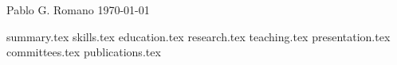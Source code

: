 \documentclass[11pt, a4paper]{awesome-cv}
\newcommand*{\sectiondir}{./sections/}
\begin{document}
\makecvheader[C]

\makecvfooter
  {Pablo G. Romano}
  {\thepage}
  {\today}

{summary.tex}
{skills.tex}
{education.tex}
{research.tex}
{teaching.tex}
{presentation.tex}
{committees.tex}
{publications.tex}
\end{document}
